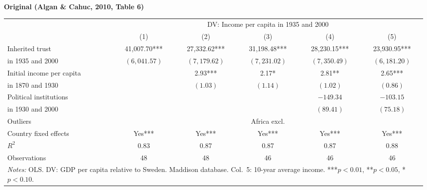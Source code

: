 \documentclass[11pt,a4paper]{article}
\begin{document}
\vspace{0.5cm}
\begin{minipage}[t]{0.48\textwidth}
\centering
\textbf{\large Original (Algan \& Cahuc, 2010, Table 6)}
\vspace{0.3cm}

\begin{adjustbox}{max width=\textwidth}
\begin{tabular}{lccccc}
\toprule
 & \multicolumn{5}{c}{DV: Income per capita in 1935 and 2000} \\
\cmidrule(lr){2-6}
 & (1) & (2) & (3) & (4) & (5) \\
\midrule
Inherited trust & 41,007.70*** & 27,332.62*** & 31,198.48*** & 28,230.15*** & 23,930.95*** \\
in 1935 and 2000 & $(6{,}041.57)$ & $(7{,}179.62)$ & $(7{,}231.02)$ & $(7{,}350.49)$ & $(6{,}181.20)$ \\[0.3em]
Initial income per capita & & 2.93*** & 2.17* & 2.81** & 2.65*** \\
in 1870 and 1930 & & $(1.03)$ & $(1.14)$ & $(1.02)$ & $(0.86)$ \\[0.3em]
Political institutions & & & & $-149.34$ & $-103.15$ \\
in 1930 and 2000 & & & & $(89.41)$ & $(75.18)$ \\[0.3em]
Outliers & & & Africa excl. & & \\
\midrule
Country fixed effects & Yes*** & Yes*** & Yes*** & Yes*** & Yes*** \\
$R^2$ & 0.83 & 0.87 & 0.87 & 0.87 & 0.88 \\
Observations & 48 & 48 & 46 & 46 & 46 \\
\bottomrule
\multicolumn{6}{p{0.95\textwidth}}{\footnotesize\textit{Notes:} OLS. DV: GDP per capita relative to Sweden. Maddison database. Col.\ 5: 10-year average income. ***$p<0.01$, **$p<0.05$, *$p<0.10$.}
\end{tabular}
\end{adjustbox}
\end{minipage}%
\hfill
\end{document}
